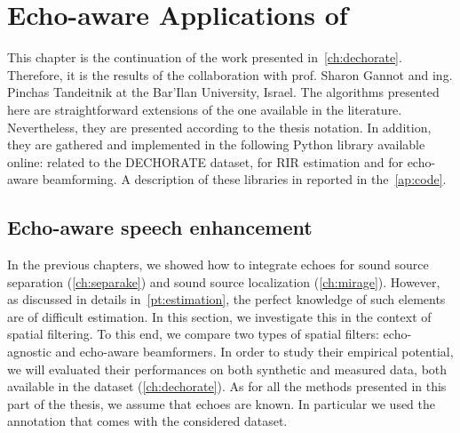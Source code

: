 \chapter{Echo-aware Applications of \dEchorate}\label{ch:dechorateapp}


\vspace{-2.5em}
 \synopsisChDecharateApp



\mynewline
This chapter is the continuation of the work presented in~\cref{ch:dechorate}.
Therefore, it is the results of the collaboration with prof. Sharon Gannot and ing. Pinchas Tandeitnik at the Bar'Ilan University, Israel.
The algorithms presented here are straightforward extensions of the one available in the literature.
Nevertheless, they are presented according to the thesis notation.
In addition, they are  gathered and implemented in the following Python library available online:
 related to the \ac{DECHORATE} dataset,  for \acs{RIR} estimation and  for echo-aware beamforming.
A description of these libraries in reported in the~\cref{ap:code}.

\section{Echo-aware speech enhancement}\label{sec:dechorateapp:se}
In the previous chapters, we showed how to integrate echoes for sound source separation (\cref{ch:separake}) and sound source localization (\cref{ch:mirage}).
However, as discussed in details in~\cref{pt:estimation}, the perfect knowledge of such elements are of difficult estimation.
In this section, we investigate this in the context of spatial filtering.
To this end, we compare two types of spatial filters: echo-agnostic and echo-aware beamformers.
In order to study their empirical potential, we will evaluated their performances on both synthetic and measured data, both available in the \dEchorate{} dataset (\cref{ch:dechorate}).
As for all the methods presented in this part of the thesis, we assume that echoes are known.
In particular we used the annotation that comes with the considered dataset.

